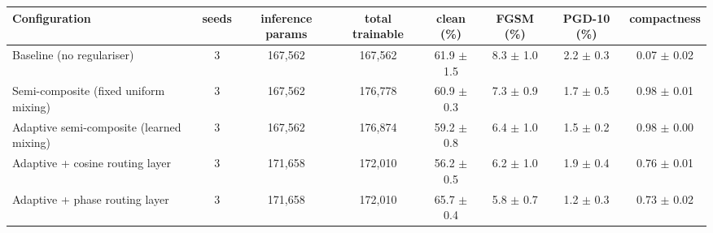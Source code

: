 \begin{tabular}{@{}lccccccc@{}}
\toprule
Configuration & seeds & inference params & total trainable & clean (\%) & FGSM (\%) & PGD-10 (\%) & compactness \\
\midrule
Baseline (no regulariser) & 3 & 167,562 & 167,562 & 61.9 $\pm$ 1.5 & 8.3 $\pm$ 1.0 & 2.2 $\pm$ 0.3 & 0.07 $\pm$ 0.02 \\
Semi-composite (fixed uniform mixing) & 3 & 167,562 & 176,778 & 60.9 $\pm$ 0.3 & 7.3 $\pm$ 0.9 & 1.7 $\pm$ 0.5 & 0.98 $\pm$ 0.01 \\
Adaptive semi-composite (learned mixing) & 3 & 167,562 & 176,874 & 59.2 $\pm$ 0.8 & 6.4 $\pm$ 1.0 & 1.5 $\pm$ 0.2 & 0.98 $\pm$ 0.00 \\
Adaptive + cosine routing layer & 3 & 171,658 & 172,010 & 56.2 $\pm$ 0.5 & 6.2 $\pm$ 1.0 & 1.9 $\pm$ 0.4 & 0.76 $\pm$ 0.01 \\
Adaptive + phase routing layer & 3 & 171,658 & 172,010 & 65.7 $\pm$ 0.4 & 5.8 $\pm$ 0.7 & 1.2 $\pm$ 0.3 & 0.73 $\pm$ 0.02 \\
\bottomrule
\end{tabular}
